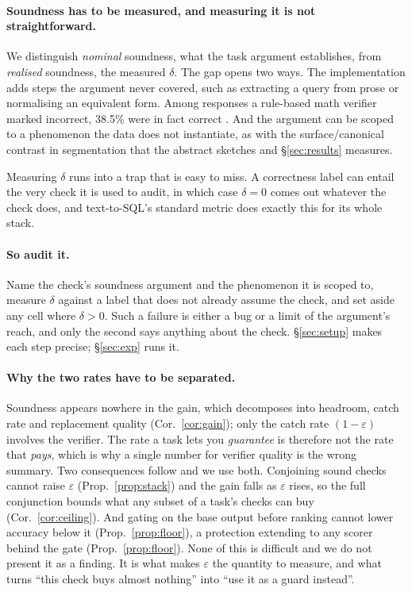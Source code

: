 \documentclass[11pt]{article}
\begin{document}
\paragraph{Soundness has to be measured, and measuring it is not
straightforward.} We distinguish \emph{nominal} soundness, what the task argument
establishes, from \emph{realised} soundness, the measured $\delta$. The gap opens
two ways. The implementation adds steps the argument never covered, such as
extracting a query from prose or normalising an equivalent form. Among responses a rule-based math verifier
marked incorrect, 38.5\% were in fact correct
\citep{tinyv2025}. And the argument can be scoped to a phenomenon the data does not instantiate,
as with the surface/canonical contrast in segmentation
\citep{cotterell2016canonical} that the abstract sketches and
\S\ref{sec:results} measures.

Measuring $\delta$ runs into a trap that is easy to miss. A correctness label can
entail the very check it is used to audit, in which case $\delta=0$ comes out
whatever the check does, and text-to-SQL's standard metric does exactly this for
its whole stack.

\paragraph{So audit it.} Name the check's soundness argument and the phenomenon
it is scoped to, measure $\delta$ against a label that does not already assume
the check, and set aside any cell where $\delta>0$. Such a failure is either a
bug or a limit of the argument's reach, and only the second says anything about
the check. \S\ref{sec:setup} makes each step precise; \S\ref{sec:exp} runs it.

\paragraph{Why the two rates have to be separated.} Soundness appears nowhere in
the gain, which decomposes into headroom, catch rate and replacement quality
(Cor.~\ref{cor:gain}); only the catch rate $(1-\varepsilon)$ involves the
verifier. The rate a task lets you \emph{guarantee} is therefore not the rate
that \emph{pays}, which is why a single number for verifier quality is the wrong
summary. Two consequences follow and we use both. Conjoining sound checks cannot
raise $\varepsilon$ (Prop.~\ref{prop:stack}) and the gain falls as $\varepsilon$
rises, so the full conjunction bounds what any subset of a task's checks can buy
(Cor.~\ref{cor:ceiling}). And gating on the base output before ranking cannot
lower accuracy below it (Prop.~\ref{prop:floor}), a protection extending to any
scorer behind the gate (Prop.~\ref{prop:floor}). None of this is difficult and we
do not present it as a finding. It is what makes $\varepsilon$ the quantity to
measure, and what turns ``this check buys almost nothing'' into ``use it as a
guard instead''.
\end{document}
